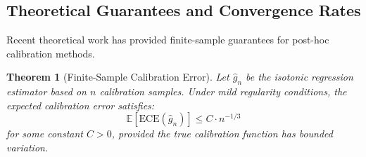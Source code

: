\documentclass[12pt, a4paper]{article}
\newtheorem{theorem}{Theorem}
\begin{document}
\subsection{Theoretical Guarantees and Convergence Rates} 

Recent theoretical work has provided finite-sample guarantees for post-hoc calibration methods.

\begin{theorem}[Finite-Sample Calibration Error]
Let $\hat{g}_n$ be the isotonic regression estimator based on $n$ calibration samples. Under mild regularity conditions, the expected calibration error satisfies:
\begin{equation}
\mathbb{E}[\text{ECE}(\hat{g}_n)] \leq C \cdot n^{-1/3}
\end{equation}
for some constant $C > 0$, provided the true calibration function has bounded variation.
\end{theorem}
\end{document}
